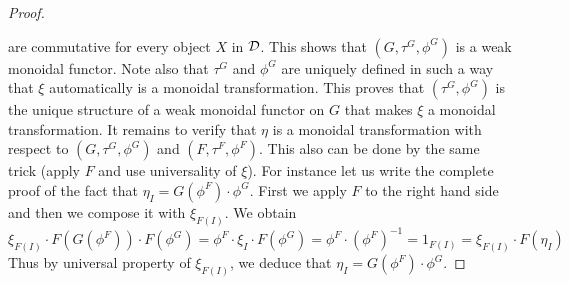 \begin{proof}
\begin{center}
\end{center}
are commutative for every object $X$ in ${\mathcal D}$. This shows that $(G,\tau^G,\phi^G)$ is a weak monoidal functor. Note also that $\tau^G$ and $\phi^G$ are uniquely defined in such a way that $\xi$ automatically is a monoidal transformation. This proves that $(\tau^G,\phi^G)$ is the unique structure of a weak monoidal functor on $G$ that makes $\xi$ a monoidal transformation. It remains to verify that $\eta$ is a monoidal transformation with respect to $(G,\tau^G, \phi^G)$ and $(F,\tau^F,\phi^F)$. This also can be done by the same trick (apply $F$ and use universality of $\xi$). For instance let us write the complete proof of the fact that $\eta_I = G(\phi^F)\cdot \phi^G$. First we apply $F$ to the right hand side and then we compose it with $\xi_{F(I)}$. We obtain
$$\xi_{F(I)}\cdot F(G(\phi^F))\cdot F(\phi^G)= \phi^F\cdot \xi_I\cdot F(\phi^G) = \phi^F\cdot \left(\phi^F\right)^{-1}=1_{F(I)} = \xi_{F(I)}\cdot F(\eta_{I}) $$
Thus by universal property of $\xi_{F(I)}$, we deduce that $\eta_I = G(\phi^F)\cdot \phi^G$.
\end{proof}

